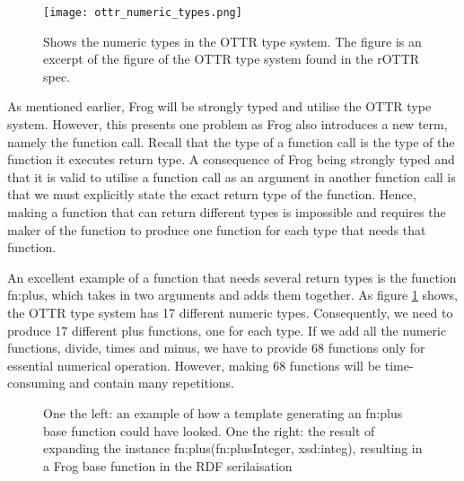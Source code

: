 \begin{figure}[b]
    \centering
    \texttt{[image: ottr\_numeric\_types.png]}
    \caption{Shows the numeric types in the OTTR type system. The figure is an excerpt of the figure of the OTTR type system found in the rOTTR spec\cite{OTTR_rOTTR}.}
    \label{fig:ottr_numeric_types}
\end{figure}

As mentioned earlier, Frog will be strongly typed and utilise the OTTR type system. However, this presents one problem as Frog also introduces a new term, namely the function call. Recall that the type of a function call is the type of the function it executes return type. A consequence of Frog being strongly typed and that it is valid to utilise a function call as an argument in another function call is that we must explicitly state the exact return type of the function. Hence, making a function that can return different types is impossible and requires the maker of the function to produce one function for each type that needs that function. 

\para
An excellent example of a function that needs several return types is the function fn:plus, which takes in two arguments and adds them together. As figure \ref{fig:ottr_numeric_types} shows, the OTTR type system has 17 different numeric types. Consequently, we need to produce 17 different plus functions, one for each type. If we add all the numeric functions, divide, times and minus, we have to provide 68 functions only for essential numerical operation. However, making 68 functions will be time-consuming and contain many repetitions. 

\begin{figure}
    \begin{minipage}{.5\textwidth}
      \centering
      
    \end{minipage}
    \begin{minipage}{.5\textwidth}
      \centering
      
    \end{minipage}
    \caption{One the left: an example of how a template generating an fn:plus base function could have looked. One the right: the result of expanding the instance fn:plus(fn:plusInteger, xsd:integ), resulting in a Frog base function in the RDF serilaisation}
    \label{fig:generating_function_example}
\end{figure}

